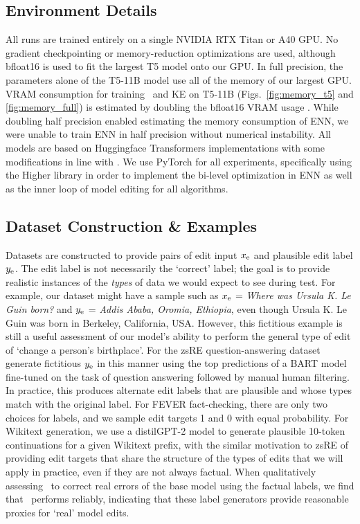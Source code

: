 \subsection{Environment Details}
\label{sec:environment-details}
All runs are trained entirely on a single NVIDIA RTX Titan or A40 GPU. No gradient checkpointing or memory-reduction optimizations are used, although bfloat16 is used to fit the largest T5 model onto our GPU. In full precision, the parameters alone of the T5-11B model use all of the memory of our largest GPU. VRAM consumption for training \name~and KE on T5-11B (Figs.~\ref{fig:memory_t5} and \ref{fig:memory_full}) is estimated by doubling the bfloat16 VRAM usage \citep{bfloat16}. While doubling half precision enabled estimating the memory consumption of ENN, we were unable to train ENN in half precision without numerical instability. All models are based on Huggingface Transformers implementations \citep{wolf2019hugging} with some modifications in line with \cite{Cao2021EditingFK}. We use PyTorch \citep{NEURIPS2019_9015} for all experiments, specifically using the Higher library \citep{grefenstette2019generalized} in order to implement the bi-level optimization in ENN as well as the inner loop of model editing for all algorithms. 

\subsection{Dataset Construction \& Examples}
\label{sec:datasets}
\makewikitable

Datasets are constructed to provide pairs of edit input $x_\text{e}$ and plausible edit label $y_\text{e}$. The edit label is not necessarily the `correct' label; the goal is to provide realistic instances of the \textit{types} of data we would expect to see during test. For example, our dataset might have a sample such as $x_\text{e}$ = \textit{Where was Ursula K. Le Guin born?} and $y_\text{e}$ = \textit{Addis Ababa, Oromia, Ethiopia}, even though Ursula K. Le Guin was born in Berkeley, California, USA. However, this fictitious example is still a useful assessment of our model's ability to perform the general type of edit of `change a person's birthplace'. For the zsRE question-answering dataset \cite{Cao2021EditingFK} generate fictitious $y_\text{e}$ in this manner using the top predictions of a BART model fine-tuned on the task of question answering followed by manual human filtering. In practice, this produces alternate edit labels that are plausible and whose types match with the original label. For FEVER fact-checking, there are only two choices for labels, and we sample edit targets 1 and 0 with equal probability. For Wikitext generation, we use a distilGPT-2 model to generate plausible 10-token continuations for a given Wikitext prefix, with the similar motivation to zsRE of providing edit targets that share the structure of the types of edits that we will apply in practice, even if they are not always factual. When qualitatively assessing \name~to correct real errors of the base model using the factual labels, we find that \name~performs reliably, indicating that these label generators provide reasonable proxies for `real' model edits.


